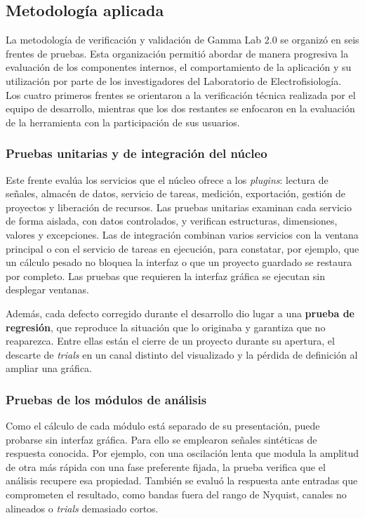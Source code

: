 \documentclass[12pt,letterpaper,oneside]{article}
\begin{document}
\subsection{Metodología aplicada}

La metodología de verificación y validación de Gamma Lab 2.0 se organizó en seis frentes de pruebas. Esta organización permitió abordar de manera progresiva la evaluación de los componentes internos, el comportamiento de la aplicación y su utilización por parte de los investigadores del Laboratorio de Electrofisiología. Los cuatro primeros frentes se orientaron a la verificación técnica realizada por el equipo de desarrollo, mientras que los dos restantes se enfocaron en la evaluación de la herramienta con la participación de sus usuarios.

\subsubsection{Pruebas unitarias y de integración del núcleo}

Este frente evalúa los servicios que el núcleo ofrece a los \textit{plugins}: lectura de señales, almacén de datos, servicio de tareas, medición, exportación, gestión de proyectos y liberación de recursos. Las pruebas unitarias examinan cada servicio de forma aislada, con datos controlados, y verifican estructuras, dimensiones, valores y excepciones. Las de integración combinan varios servicios con la ventana principal o con el servicio de tareas en ejecución, para constatar, por ejemplo, que un cálculo pesado no bloquea la interfaz o que un proyecto guardado se restaura por completo. Las pruebas que requieren la interfaz gráfica se ejecutan sin desplegar ventanas.

Además, cada defecto corregido durante el desarrollo dio lugar a una \textbf{prueba de regresión}, que reproduce la situación que lo originaba y garantiza que no reaparezca. Entre ellas están el cierre de un proyecto durante su apertura, el descarte de \textit{trials} en un canal distinto del visualizado y la pérdida de definición al ampliar una gráfica.

\subsubsection{Pruebas de los módulos de análisis}

Como el cálculo de cada módulo está separado de su presentación, puede probarse sin interfaz gráfica. Para ello se emplearon señales sintéticas de respuesta conocida. Por ejemplo, con una oscilación lenta que modula la amplitud de otra más rápida con una fase preferente fijada, la prueba verifica que el análisis recupere esa propiedad. También se evaluó la respuesta ante entradas que comprometen el resultado, como bandas fuera del rango de Nyquist, canales no alineados o \textit{trials} demasiado cortos.
\end{document}
